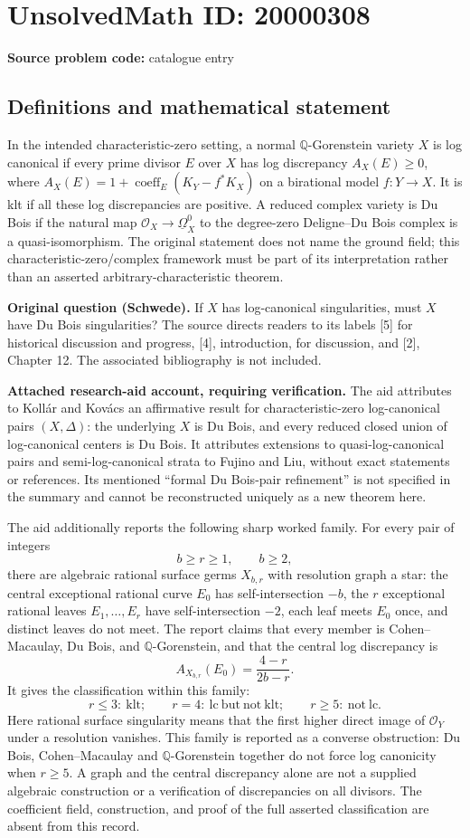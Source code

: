 \documentclass[11pt]{article}
\newcommand{\Q}{\mathbb{Q}}
\begin{document}
\section*{UnsolvedMath ID: 20000308}
\textbf{Source problem code:} catalogue entry
\subsection{Definitions and mathematical statement}
In the intended characteristic-zero setting, a normal $\Q$-Gorenstein variety $X$ is log canonical if every prime divisor $E$ over $X$ has log discrepancy $A_X(E)\ge0$, where $A_X(E)=1+\operatorname{coeff}_E(K_Y-f^*K_X)$ on a birational model $f:Y\to X$. It is klt if all these log discrepancies are positive. A reduced complex variety is Du Bois if the natural map $\mathcal O_X\to\underline\Omega_X^0$ to the degree-zero Deligne--Du Bois complex is a quasi-isomorphism. The original statement does not name the ground field; this characteristic-zero/complex framework must be part of its interpretation rather than an asserted arbitrary-characteristic theorem.

\textbf{Original question (Schwede).} If $X$ has log-canonical singularities, must $X$ have Du Bois singularities? The source directs readers to its labels [5] for historical discussion and progress, [4], introduction, for discussion, and [2], Chapter 12. The associated bibliography is not included.

\textbf{Attached research-aid account, requiring verification.} The aid attributes to Kollár and Kovács an affirmative result for characteristic-zero log-canonical pairs $(X,\Delta)$: the underlying $X$ is Du Bois, and every reduced closed union of log-canonical centers is Du Bois. It attributes extensions to quasi-log-canonical pairs and semi-log-canonical strata to Fujino and Liu, without exact statements or references. Its mentioned ``formal Du Bois-pair refinement'' is not specified in the summary and cannot be reconstructed uniquely as a new theorem here.

The aid additionally reports the following sharp worked family. For every pair of integers
\[b\ge r\ge1,\qquad b\ge2,\]
there are algebraic rational surface germs $X_{b,r}$ with resolution graph a star: the central exceptional rational curve $E_0$ has self-intersection $-b$, the $r$ exceptional rational leaves $E_1,\ldots,E_r$ have self-intersection $-2$, each leaf meets $E_0$ once, and distinct leaves do not meet. The report claims that every member is Cohen--Macaulay, Du Bois, and $\Q$-Gorenstein, and that the central log discrepancy is
\[A_{X_{b,r}}(E_0)=\frac{4-r}{2b-r}.\]
It gives the classification within this family:
\[r\le3:\ \mathrm{klt};\qquad r=4:\ \mathrm{lc\ but\ not\ klt};\qquad r\ge5:\ \mathrm{not\ lc}.\]
Here rational surface singularity means that the first higher direct image of $\mathcal O_Y$ under a resolution vanishes. This family is reported as a converse obstruction: Du Bois, Cohen--Macaulay and $\Q$-Gorenstein together do not force log canonicity when $r\ge5$. A graph and the central discrepancy alone are not a supplied algebraic construction or a verification of discrepancies on all divisors. The coefficient field, construction, and proof of the full asserted classification are absent from this record.
\end{document}
